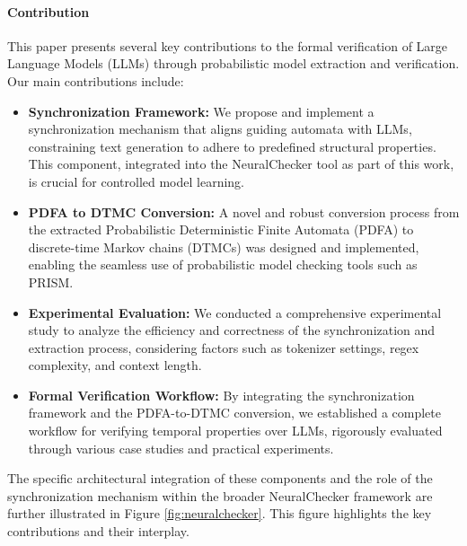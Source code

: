 \documentclass{article}
\begin{document}
\paragraph{Contribution}

This paper presents several key contributions to the formal verification of Large Language Models (LLMs) through probabilistic model extraction and verification. Our main contributions include:

\begin{itemize}
    \item \textbf{Synchronization Framework:} We propose and implement a synchronization mechanism that aligns guiding automata with LLMs, constraining text generation to adhere to predefined structural properties. This component, integrated into the NeuralChecker tool as part of this work, is crucial for controlled model learning.
    \item \textbf{PDFA to DTMC Conversion:} A novel and robust conversion process from the extracted Probabilistic Deterministic Finite Automata (PDFA) to discrete-time Markov chains (DTMCs) was designed and implemented, enabling the seamless use of probabilistic model checking tools such as PRISM.
    \item \textbf{Experimental Evaluation:} We conducted a comprehensive experimental study to analyze the efficiency and correctness of the synchronization and extraction process, considering factors such as tokenizer settings, regex complexity, and context length.
    \item \textbf{Formal Verification Workflow:} By integrating the synchronization framework and the PDFA-to-DTMC conversion, we established a complete workflow for verifying temporal properties over LLMs, rigorously evaluated through various case studies and practical experiments.
\end{itemize}

The specific architectural integration of these components and the role of the synchronization mechanism within the broader NeuralChecker framework are further illustrated in Figure \ref{fig:neuralchecker}. This figure highlights the key contributions and their interplay.
\end{document}
